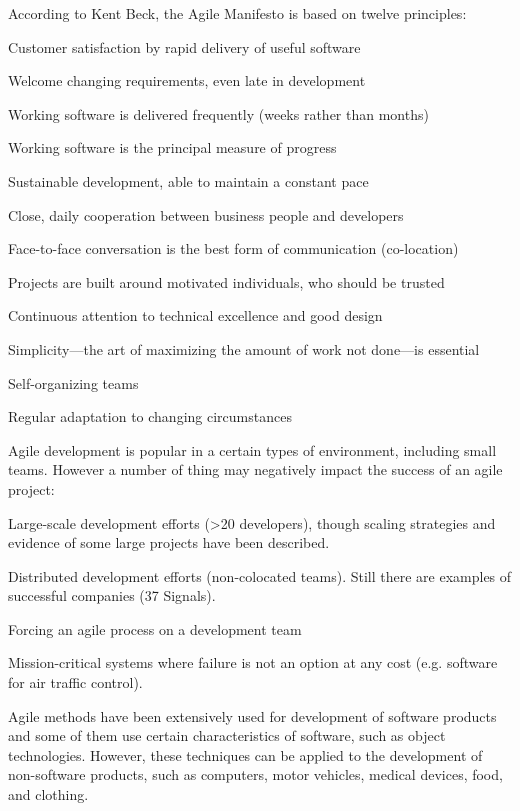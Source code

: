 According to Kent Beck,\cite{beck} the Agile Manifesto is based on twelve principles:
\begin{compactenum}
\item Customer satisfaction by rapid delivery of useful software
\item Welcome changing requirements, even late in development
\item Working software is delivered frequently (weeks rather than months)
\item Working software is the principal measure of progress
\item Sustainable development, able to maintain a constant pace
\item Close, daily cooperation between business people and developers
\item Face-to-face conversation is the best form of communication (co-location)
\item Projects are built around motivated individuals, who should be trusted
\item Continuous attention to technical excellence and good design
\item Simplicity—the art of maximizing the amount of work not done—is essential
\item Self-organizing teams
\item Regular adaptation to changing circumstances
\end{compactenum}


Agile development is popular in a certain types of environment, including small teams. However a number of thing may negatively impact the success of an agile project:

\begin{compactenum}
\item Large-scale development efforts (\textgreater 20 developers), though scaling strategies \cite{ambler} and evidence of some large projects \cite{schaaf} have been described.
\item Distributed development efforts (non-colocated teams). Still there are examples of successful companies (37 Signals).
\item Forcing an agile process on a development team
\item Mission-critical systems where failure is not an option at any cost (e.g. software for air traffic control).
\end{compactenum}

Agile methods have been extensively used for development of software products and some of them use certain characteristics of software, such as object technologies. However, these techniques can be applied to the development of non-software products, such as computers, motor vehicles, medical devices, food, and clothing.

